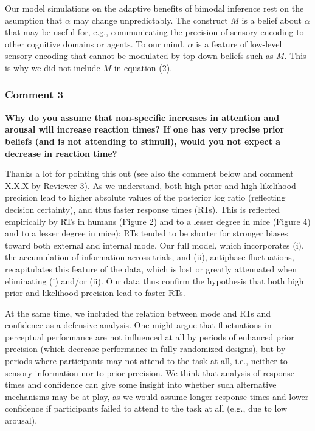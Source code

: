 \documentclass[
]{article}
\begin{document}
Our model simulations on the adaptive benefits of bimodal inference rest
on the asumption that \(\alpha\) may change unpredictably. The construct
\(M\) is a belief about \(\alpha\) that may be useful for, e.g.,
communicating the precision of sensory encoding to other cognitive
domains or agents. To our mind, \(\alpha\) is a feature of low-level
sensory encoding that cannot be modulated by top-down beliefs such as
\(M\). This is why we did not include \(M\) in equation (2).

\hypertarget{comment-3}{%
\subsubsection{Comment 3}\label{comment-3}}

\textbf{Why do you assume that non-specific increases in attention and
arousal will increase reaction times? If one has very precise prior
beliefs (and is not attending to stimuli), would you not expect a
decrease in reaction time?}

Thanks a lot for pointing this out (see also the comment below and
comment X.X.X by Reviewer 3). As we understand, both high prior and high
likelihood precision lead to higher absolute values of the posterior log
ratio (reflecting decision certainty), and thus faster response times
(RTs). This is reflected empirically by RTs in humans (Figure 2) and to
a lesser degree in mice (Figure 4) and to a lesser degree in mice): RTs
tended to be shorter for stronger biases toward both external and
internal mode. Our full model, which incorporates (i), the accumulation
of information across trials, and (ii), antiphase fluctuations,
recapitulates this feature of the data, which is lost or greatly
attenuated when eliminating (i) and/or (ii). Our data thus confirm the
hypothesis that both high prior and likelihood precision lead to faster
RTs.

At the same time, we included the relation between mode and RTs and
confidence as a defensive analysis. One might argue that fluctuations in
perceptual performance are not influenced at all by periods of enhanced
prior precision (which decrease performance in fully randomized
designs), but by periods where participants may not attend to the task
at all, i.e., neither to sensory information nor to prior precision. We
think that analysis of response times and confidence can give some
insight into whether such alternative mechanisms may be at play, as we
would assume longer response times and lower confidence if participants
failed to attend to the task at all (e.g., due to low arousal).
\end{document}
